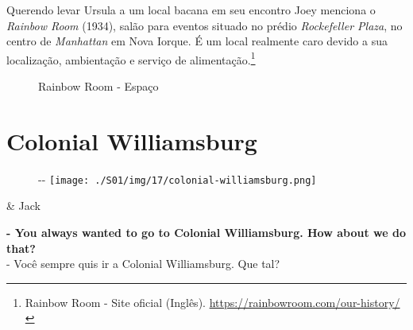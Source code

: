 Querendo levar Ursula a um local bacana em seu encontro Joey menciona o
\emph{Rainbow Room} (1934), salão para eventos situado no prédio
\emph{Rockefeller Plaza}, no centro de \emph{Manhattan} em Nova Iorque.
É um local realmente caro devido a sua localização, ambientação e
serviço de alimentação.\footnote{\sloppy Rainbow Room - Site oficial (Inglês). \url{https://rainbowroom.com/our-history/}}

\begin{figure}
  \centering
    \caption{Rainbow Room - Espaço\label{fig:rainbow-room-espa-o}}
\end{figure}

\hypertarget{colonial-williamsburg}{%
\section{Colonial Williamsburg}\label{colonial-williamsburg}}

\begin{figure}[!ht]
  \begin{adjustwidth}{-\oddsidemargin-1in}{-\rightmargin}
    \centering
    \texttt{[image: ./S01/img/17/colonial-williamsburg.png]}
  \end{adjustwidth}
\end{figure}

\begin{tcolorbox}[enhanced,center upper,
    drop fuzzy shadow southeast, boxrule=0.3pt,
    lower separated=false, breakable,
    colframe=black!30!dialogoBorder,colback=white]
\begin{minipage}[c]{0.16\linewidth}
   & \centering \scriptsize{Jack}
\end{minipage}
\hfill
\begin{minipage}[c]{0.8\linewidth}
  \textbf{- You always wanted to go to Colonial Williamsburg. How about we do that?}\\
  - Você sempre quis ir a Colonial Williamsburg. Que tal?
\end{minipage}
\end{tcolorbox}


